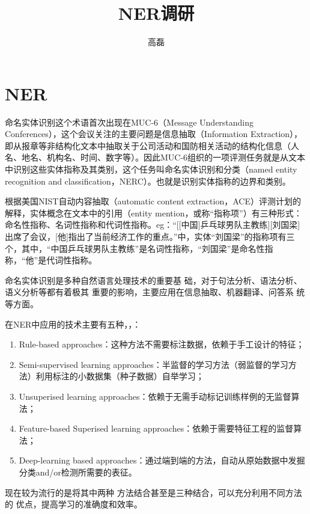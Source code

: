\documentclass[a4paper,UTF8,no-math]{ctexart}
\title{NER调研}
\author{高磊}
\date{\zhtoday}
\begin{document}
	\tableofcontents
	
	\newpage
	
	\section{NER}
	命名实体识别这个术语首次出现在MUC-6（Message Understanding Conferences），这个会议关注的主要问题是信息抽取（Information Extraction），即从报章等非结构化文本中抽取关于公司活动和国防相关活动的结构化信息（人名、地名、机构名、时间、数字等）。因此MUC-6组织的一项评测任务就是从文本中识别这些实体指称及其类别，这个任务叫命名实体识别和分类（named entity recognition and classification，NERC）。也就是识别实体指称的边界和类别。
	
	根据美国NIST自动内容抽取（automatic content extraction，ACE）评测计划的解释，实体概念在文本中的引用（entity mention，或称“指称项”）有三种形式：命名性指称、名词性指称和代词性指称。eg：“[[中国]乒乓球男队主教练][刘国梁]出席了会议，[他]指出了当前经济工作的重点。”中，实体“刘国梁”的指称项有三个，其中，“中国乒乓球男队主教练”是名词性指称，“刘国梁”是命名性指称，“他”是代词性指称。
	
	    命名实体识别是多种自然语言处理技术的重要基
	础，对于句法分析、语法分析、语义分析等都有着极其
	重要的影响，主要应用在信息抽取、机器翻译、问答系
	统等方面。
	
	在NER中应用的技术主要有五种\citep{nadeau2007survey}，\citep{li2018survey}，\citep{宗成庆2013统计自然语言处理}：
	
	\begin{enumerate}
		\item Rule-based approaches：这种方法不需要标注数据，依赖于手工设计的特征；
		\item Semi-supervised learning approaches：半监督的学习方法（弱监督的学习方法）利用标注的小数据集（种子数据）自举学习；
		\item Unsuperised learning approaches：依赖于无需手动标记训练样例的无监督算法；
		\item Feature-based Superised learning approaches：依赖于需要特征工程的监督算法；
		\item Deep-learning based approaches：通过端到端的方法，自动从原始数据中发掘分类and/or检测所需要的表征。
	\end{enumerate}
	
	现在较为流行的是将其中两种
	方法结合甚至是三种结合，可以充分利用不同方法的
	优点，提高学习的准确度和效率。
	
\end{document}
